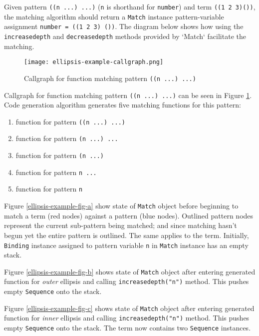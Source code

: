 
Given pattern \texttt{((n ...) ...)} (\texttt{n} is shorthand for \texttt{number}) and term \texttt{((1 2 3)())}, the matching algorithm should return a \texttt{Match} instance pattern-variable assignment \texttt{number = ((1 2 3) ())}. The diagram below shows how using the \texttt{increasedepth} and \texttt{decreasedepth} methods provided by `Match` facilitate the matching.

\begin{figure}[h]
\texttt{[image: ellipsis-example-callgraph.png]}
\caption{Callgraph for function matching pattern \texttt{((n ...) ...)}}
\label{ellipsis-example-callgraph}
\end{figure}

Callgraph for function matching pattern \texttt{((n ...) ...)} can be seen in Figure \ref{ellipsis-example-callgraph}. Code generation algorithm generates five matching functions for this pattern:

\begin{enumerate}
\item function for pattern \texttt{((n ...) ...)}
\item function for pattern \texttt{(n ...) ...}
\item function for pattern \texttt{(n ...) }
\item function for pattern \texttt{n ... }
\item function for pattern \texttt{n}
\end{enumerate}

Figure \ref{ellipsis-example-fig-a} show state of \texttt{Match} object before beginning to match a term (red nodes) against a pattern (blue nodes). Outlined pattern nodes represent the current sub-pattern being matched; and since matching hasn't begun yet the entire pattern is outlined. The same applies to the term. Initially, \texttt{Binding} instance assigned to pattern variable \texttt{n} in \texttt{Match} instance has an empty stack.

Figure \ref{ellipsis-example-fig-b} shows state of \texttt{Match} object after entering generated function for \textit{outer} ellipsis and calling \texttt{increasedepth("n")} method. This pushes empty \texttt{Sequence} onto the stack.


Figure \ref{ellipsis-example-fig-c} shows state of \texttt{Match} object after entering generated function for \textit{inner} ellipsis and calling \texttt{increasedepth("n")} method. This pushes empty \texttt{Sequence} onto the stack. The term now contains two \texttt{Sequence} instances.

